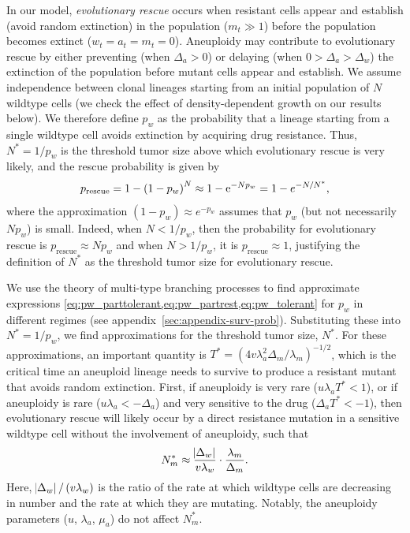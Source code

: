 \documentclass[12pt]{extarticle}
\newcommand{\e}{{\rm e}}
\newcommand{\presc}{p_\text{rescue}}
\begin{document}
In our model, \emph{evolutionary rescue} occurs when resistant cells appear and establish (avoid random extinction) in the population  ($m_t \gg 1$) before the population becomes extinct ($w_t=a_t=m_t=0$).
Aneuploidy may contribute to evolutionary rescue by either preventing (when $\Delta_a>0$) or delaying (when $0>\Delta_a>\Delta_w$) the extinction of the population before mutant cells appear and establish.
We assume independence between clonal lineages starting from an initial population of $N$ wildtype cells (we check the effect of density-dependent growth on our results below).
We therefore define $p_w$ as the probability that a lineage starting from a single wildtype cell avoids extinction by acquiring drug resistance.
Thus, $N^*=1/p_w$ is the threshold tumor size above which evolutionary rescue is very likely, and the rescue probability is given by 
\begin{equation} \label{eq:rescue_prob} 
\presc = 
1-\left(1-p_w\right)^N \approx
1-\e^{-Np_w} = 
1-e^{-N/N^*} ,
\end{equation}
where the approximation $(1-p_w)\approx e^{-p_w}$ assumes that $p_w$ (but not necessarily $N p_w$) is small.
Indeed, when $N<1/p_w$, then the probability for evolutionary rescue is $\presc \approx N p_w$  and when $N > 1/p_w$, it is $\presc \approx 1$, justifying the definition of $N^*$ as the threshold tumor size for evolutionary rescue. 

We use the theory of multi-type branching processes to find approximate expressions \cref{eq:pw_parttolerant,eq:pw_partrest,eq:pw_tolerant} for $p_w$ in different regimes (see appendix~\ref{sec:appendix-surv-prob}). 
Substituting these into $N^*=1/p_w$, we find approximations for the threshold tumor size, $N^*$. 
For these approximations, an important quantity is $T^* = (4 v \lambda_a^2 \Delta_m/\lambda_m)^{-1/2}$, which is the critical time an aneuploid lineage needs to survive to produce a resistant mutant that avoids random extinction.
First, if aneuploidy is very rare ($u\lambda_a T^*< 1$), or if aneuploidy is rare ($u\lambda_a < -\Delta_a$) and very sensitive to the drug ($\Delta_a T^* < -1$), then evolutionary rescue will likely occur by a direct resistance mutation in a sensitive wildtype cell without the involvement of aneuploidy, such that 
\begin{equation} \label{eq:N_m}
N_m^* \approx \frac{\abs{\Delta_w}}{v\lambda_w} \cdot \frac{\lambda_m}{\Delta_m} .
\end{equation}
Here, $\abs{\Delta_w}/\left(v\lambda_w\right)$ is the ratio of the rate at which wildtype cells are decreasing in number and the rate at which they are mutating. Notably, the aneuploidy parameters ($u$, $\lambda_a$, $\mu_a$) do not affect $N_m^*$.
\end{document}
